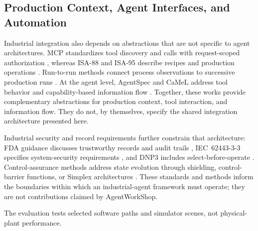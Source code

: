 \subsection{Production Context, Agent Interfaces, and Automation}
Industrial integration also depends on abstractions that are not specific to
agent architectures. MCP standardizes tool discovery and calls with
request-scoped authorization \cite{mcp2024}, whereas
ISA-88 and ISA-95 describe recipes and production operations
\cite{isa88_2010,isa95_2025}. Run-to-run methods connect process observations
to successive production runs \cite{moyne2000r2r}. At the agent level,
AgentSpec and CaMeL address tool behavior and capability-based information
flow \cite{wang2025agentspec,debenedetti2025camel}. Together, these works
provide complementary abstractions for production context, tool interaction,
and information flow. They do not, by themselves, specify the shared
integration architecture presented here.

Industrial security and record requirements further constrain that
architecture: FDA guidance discusses trustworthy records and audit trails
\cite{part11}, IEC~62443-3-3 specifies system-security requirements
\cite{iec62443-3-3}, and DNP3 includes select-before-operate
\cite{ieee1815dnp3}. Control-assurance methods address state evolution through
shielding, control-barrier functions, or Simplex architectures
\cite{alshiekh2018shielding,ames2017cbf,sha2001simplex}. These standards and
methods inform the boundaries within which an industrial-agent framework must
operate; they are not contributions claimed by AgentWorkShop.

The evaluation tests selected software paths and simulator scenes, not
physical-plant performance.
